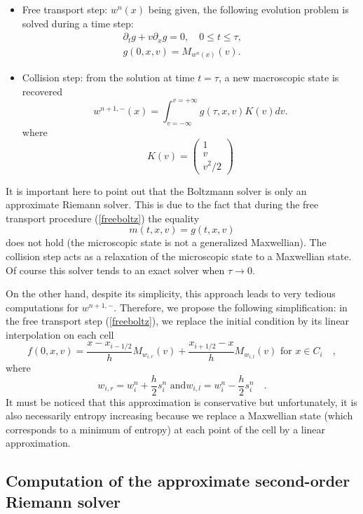 \documentclass{fldauth}
\theoremstyle{plain}
\theoremstyle{plain}
\theoremstyle{plain}
\theoremstyle{plain}
\theoremstyle{plain}
\theoremstyle{plain}
\begin{document}
\begin{itemize}
\item Free transport step: \( w^{n}(x) \) being given, the following evolution problem
is solved during a time step:
\begin{eqnarray}
\partial _{t}g+v\partial _{x}g=0,\quad 0\leq t\leq \tau , &  & \nonumber \\
g(0,x,v)=M_{w^{n}(x)}(v).\label{freeboltz}
\end{eqnarray}

\item Collision step: from the solution at time \( t=\tau  \), a new macroscopic
state is recovered
\[
w^{n+1,-}(x)=\int _{v=-\infty }^{v=+\infty }g(\tau ,x,v)K(v)dv.\]
 where
\[
K(v)=\left( \begin{array}{c}
1\\
v\\
v^{2}/2
\end{array}\right) \]

\end{itemize}
It is important here to point out that the Boltzmann solver is only an approximate
Riemann solver. This is due to the fact that during the free transport procedure
(\ref{freeboltz}) the equality
\[
m(t,x,v)=g(t,x,v)\]
 does not hold (the microscopic state is not a generalized Maxwellian). The collision step
acts as a relaxation of the microscopic state to a Maxwellian state. Of course
this solver tends to an exact solver when \( \tau \rightarrow 0 \).

On the other hand, despite its simplicity, this approach leads to very tedious
computations for \( w^{n+1,-} \). Therefore, we propose the following simplification:
in the free transport step (\ref{freeboltz}), we replace the initial condition
by its linear interpolation on each cell
\[
f(0,x,v)=\frac{x-x_{i-1/2}}{h}M_{w_{i,r}}(v)+\frac{x_{i+1/2}-x}{h}M_{w_{i,l}}(v)\textrm{ for }x\in C_{i}\quad ,\]
 where
\[
w_{i,r}=w_{i}^{n}+\frac{h}{2}s_{i}^{n}\textrm{ and
}w_{i,l}=w_{i}^{n}-\frac{h}{2}s_{i}^{n}\quad .\] It must be
noticed that this approximation is conservative but unfortunately,
it is also necessarily entropy increasing because we replace a
Maxwellian state (which corresponds to a minimum of entropy) at
each point of the cell by a linear approximation.


\subsection{Computation of the approximate second-order Riemann solver}
\end{document}
